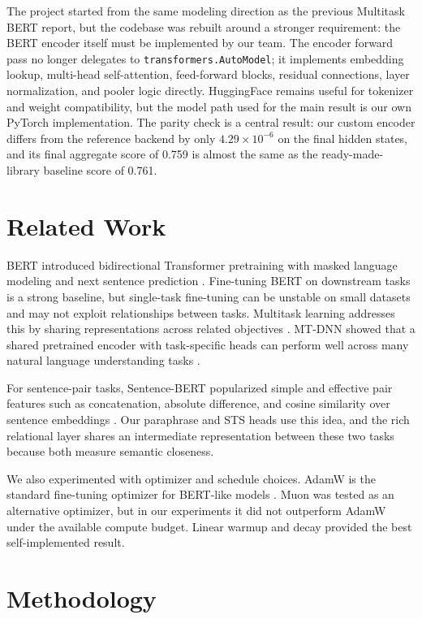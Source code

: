 \documentclass{article}
\begin{document}
The project started from the same modeling direction as the previous Multitask BERT report, but the codebase was rebuilt around a stronger requirement: the BERT encoder itself must be implemented by our team. The encoder forward pass no longer delegates to \texttt{transformers.AutoModel}; it implements embedding lookup, multi-head self-attention, feed-forward blocks, residual connections, layer normalization, and pooler logic directly. HuggingFace remains useful for tokenizer and weight compatibility, but the model path used for the main result is our own PyTorch implementation. The parity check is a central result: our custom encoder differs from the reference backend by only $4.29\times10^{-6}$ on the final hidden states, and its final aggregate score of 0.759 is almost the same as the ready-made-library baseline score of 0.761.

\section{Related Work}

BERT introduced bidirectional Transformer pretraining with masked language modeling and next sentence prediction \cite{devlin2019bert}. Fine-tuning BERT on downstream tasks is a strong baseline, but single-task fine-tuning can be unstable on small datasets and may not exploit relationships between tasks. Multitask learning addresses this by sharing representations across related objectives \cite{caruana1997multitask}. MT-DNN showed that a shared pretrained encoder with task-specific heads can perform well across many natural language understanding tasks \cite{liu2019mtdnn}.

For sentence-pair tasks, Sentence-BERT popularized simple and effective pair features such as concatenation, absolute difference, and cosine similarity over sentence embeddings \cite{reimers2019sbert}. Our paraphrase and STS heads use this idea, and the rich relational layer shares an intermediate representation between these two tasks because both measure semantic closeness.

We also experimented with optimizer and schedule choices. AdamW is the standard fine-tuning optimizer for BERT-like models \cite{loshchilov2019adamw}. Muon was tested as an alternative optimizer, but in our experiments it did not outperform AdamW under the available compute budget. Linear warmup and decay provided the best self-implemented result.

\section{Methodology}
\end{document}
